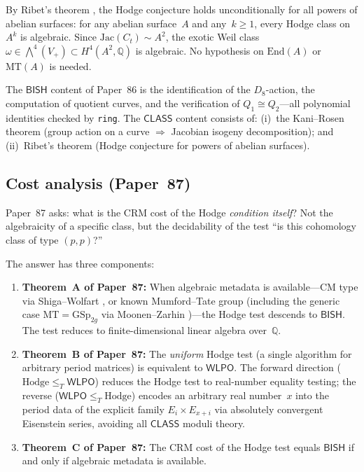 \documentclass[11pt]{article}
\theoremstyle{plain}
\theoremstyle{definition}
\theoremstyle{remark}
\newcommand{\QQ}{\mathbb{Q}}
\newcommand{\End}{\mathrm{End}}
\newcommand{\MT}{\mathrm{MT}}
\newcommand{\GSp}{\mathrm{GSp}}
\newcommand{\Jac}{\mathrm{Jac}}
\newcommand{\BISH}{\mathsf{BISH}}
\newcommand{\WLPO}{\mathsf{WLPO}}
\newcommand{\CLASS}{\mathsf{CLASS}}
\begin{document}
By Ribet's theorem \cite{ribet83}, the Hodge conjecture holds
unconditionally for all powers of abelian surfaces: for any abelian
surface~$A$ and any~$k \geq 1$, every Hodge class on~$A^k$ is
algebraic.  Since $\Jac(C_t) \sim A^2$, the exotic Weil class
$\omega \in \bigwedge^4(V_+) \subset H^4(A^2, \QQ)$ is algebraic.
No hypothesis on $\End(A)$ or $\MT(A)$ is needed.

The $\BISH$ content of Paper~86 is the identification of the
$D_8$-action, the computation of quotient curves, and the
verification of $Q_1 \cong Q_2$---all polynomial identities checked
by \texttt{ring}.  The $\CLASS$ content consists of: (i)~the
Kani--Rosen theorem (group action on a curve $\Rightarrow$ Jacobian
isogeny decomposition); and (ii)~Ribet's theorem (Hodge conjecture
for powers of abelian surfaces).


\subsection{Cost analysis (Paper~87)}

Paper~87 \cite{p87} asks: what is the CRM cost of the Hodge
\emph{condition itself}?  Not the algebraicity of a specific class,
but the decidability of the test ``is this cohomology class of
type $(p,p)$?''

The answer has three components:

\begin{enumerate}[label=(\roman*)]
\item \textbf{Theorem~A of Paper~87:} When algebraic metadata is
  available---CM type via Shiga--Wolfart \cite{shiga-wolfart}, or
  known Mumford--Tate group (including the generic case
  $\MT = \GSp_{2g}$ via Moonen--Zarhin \cite{moonen-zarhin})---the
  Hodge test descends to $\BISH$.  The test reduces to
  finite-dimensional linear algebra over~$\QQ$.

\item \textbf{Theorem~B of Paper~87:} The \emph{uniform} Hodge
  test (a single algorithm for arbitrary period matrices) is
  equivalent to $\WLPO$.  The forward direction ($\text{Hodge}
  \le_T \WLPO$) reduces the Hodge test to real-number equality
  testing; the reverse ($\WLPO \le_T \text{Hodge}$) encodes an
  arbitrary real number~$x$ into the period data of the explicit
  family $E_i \times E_{x+i}$ via absolutely convergent Eisenstein
  series, avoiding all $\CLASS$ moduli theory.

\item \textbf{Theorem~C of Paper~87:} The CRM cost of the Hodge
  test equals $\BISH$ if and only if algebraic metadata is available.
\end{enumerate}
\end{document}
